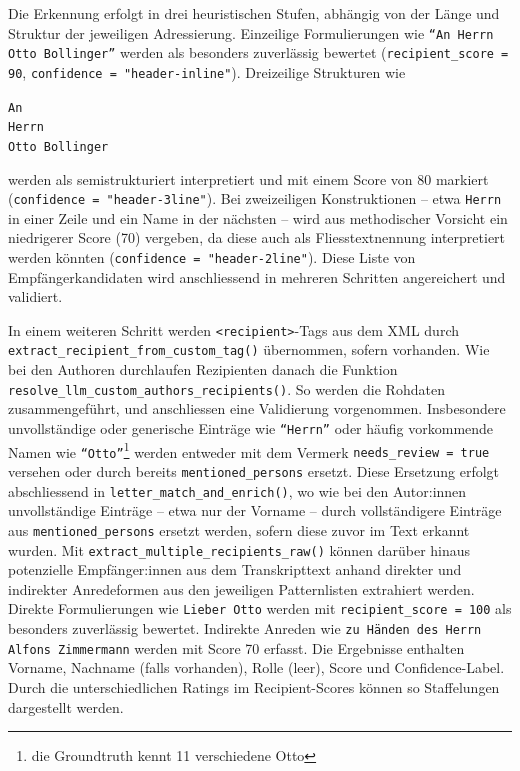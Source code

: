 \documentclass[12pt, a4paper, ngerman, bidi=default]{article}
\newcommand{\code}[1]{\colorbox{VeryLightGray}{\texttt{#1}}} %
\begin{document}
Die Erkennung erfolgt in drei heuristischen Stufen, abhängig von der Länge und Struktur der jeweiligen Adressierung. Einzeilige Formulierungen wie \texttt{\enquote{An Herrn Otto Bollinger}} werden als besonders zuverlässig bewertet (\code{recipient\_score = 90}, \code{confidence = "header-inline"}). Dreizeilige Strukturen wie 
\\ \begin{center}
\texttt{An\\Herrn\\Otto Bollinger}
\end{center}
\justifying werden als semistrukturiert interpretiert und mit einem Score von 80 markiert (\code{confidence = "header-3line"}). Bei zweizeiligen Konstruktionen – etwa \texttt{Herrn} in einer Zeile und ein Name in der nächsten – wird aus methodischer Vorsicht ein niedrigerer Score (70) vergeben, da diese auch als Fliesstextnennung interpretiert werden könnten (\code{confidence = "header-2line"}). Diese Liste von Empfängerkandidaten wird anschliessend in mehreren Schritten angereichert und validiert.

In einem weiteren Schritt werden \code{<recipient>}-Tags aus dem XML durch \code{extract\_recipient\_from\_custom\_tag()} übernommen, sofern vorhanden. Wie bei den Authoren durchlaufen Rezipienten danach die Funktion \code{resolve\_llm\_custom\_authors\_recipients()}. So werden die Rohdaten zusammengeführt, und anschliessen eine Validierung vorgenommen. Insbesondere unvollständige oder generische Einträge wie \texttt{\enquote{Herrn}} oder häufig vorkommende Namen wie \texttt{\enquote{Otto}}\footnote{die Groundtruth kennt 11 verschiedene Otto} werden entweder mit dem Vermerk \code{needs\_review = true} versehen oder durch bereits \code{mentioned\_persons} ersetzt. Diese Ersetzung erfolgt abschliessend in \code{letter\_match\_and\_enrich()}, wo wie bei den Autor:innen unvollständige Einträge – etwa nur der Vorname – durch vollständigere Einträge aus \code{mentioned\_persons} ersetzt werden, sofern diese zuvor im Text erkannt wurden. Mit \code{extract\_multiple\_recipients\_raw()} können darüber hinaus potenzielle Empfänger:innen aus dem Transkripttext anhand direkter und indirekter Anredeformen aus den jeweiligen Patternlisten extrahiert werden. Direkte Formulierungen wie \texttt{Lieber Otto} werden mit \code{recipient\_score = 100} als besonders zuverlässig bewertet. Indirekte Anreden wie \texttt{zu Händen des Herrn Alfons Zimmermann} werden mit Score 70 erfasst. Die Ergebnisse enthalten Vorname, Nachname (falls vorhanden), Rolle (leer), Score und Confidence-Label. Durch die unterschiedlichen Ratings im Recipient-Scores können so Staffelungen dargestellt werden.
\end{document}
